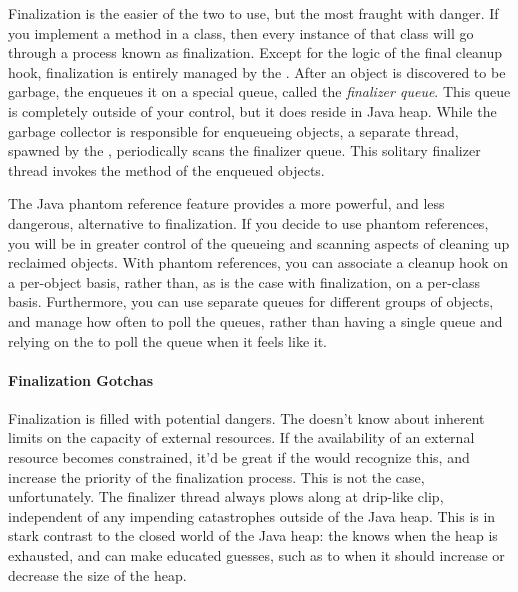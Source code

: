 Finalization is the easier of the two to use, but the most fraught with danger.
If you implement a  method in a class, then every instance of
that class will go through a process known as finalization. Except for the logic
of the final cleanup hook, finalization is entirely managed by the \jre. After
an object is discovered to be garbage, the \jre enqueues it on a special queue,
called the \emph{finalizer queue}. This queue is completely outside of your
control, but it does reside in Java heap. While the garbage collector is
responsible for enqueueing objects, a separate thread, spawned by the \jre,
periodically scans the finalizer queue. This solitary finalizer thread invokes
the  method of the enqueued objects.

The Java phantom reference feature provides a more powerful, and less dangerous,
alternative to finalization. If you decide to use phantom references, you will
be in greater control of the queueing and scanning aspects of cleaning up
reclaimed objects. With phantom references, you can associate a cleanup hook on
a per-object basis, rather than, as is the case with finalization, on a
per-class basis. Furthermore, you can use separate queues for different groups
of objects, and manage how often to poll the queues, rather than having a single
queue and relying on the \jre to poll the queue when it feels like it.





\paragraph{Finalization Gotchas}

Finalization is filled with potential dangers. The \jre doesn't know about
inherent limits on the capacity of external resources. If the availability of an
external resource becomes constrained, it'd be great if the \jre would recognize
this, and increase the priority of the finalization process. This is not the
case, unfortunately. The finalizer thread always plows along at drip-like clip,
independent of any impending catastrophes outside of the Java heap.
This is in stark contrast to the closed world of the Java heap: the \jre knows
when the heap is exhausted, and can make educated guesses, such as to when it
should increase or decrease the size of the heap. 

